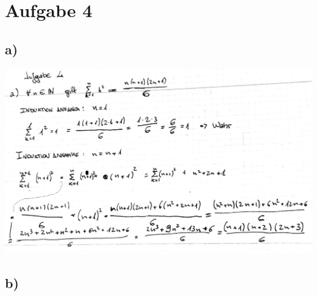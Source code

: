 \documentclass[12pt,a4paper,landscape]{article}
\begin{document}
\section*{Aufgabe 4}
\subsection*{a)}
\includegraphics[scale=0.3]{AB2-4_1.jpg} 
\subsection*{b)}
\end{document}
